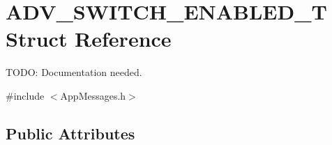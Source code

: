 \hypertarget{struct_a_d_v___s_w_i_t_c_h___e_n_a_b_l_e_d___t}{}\section{A\+D\+V\+\_\+\+S\+W\+I\+T\+C\+H\+\_\+\+E\+N\+A\+B\+L\+E\+D\+\_\+\+T Struct Reference}
\label{struct_a_d_v___s_w_i_t_c_h___e_n_a_b_l_e_d___t}


T\+O\+D\+O\+: Documentation needed.  




{\ttfamily \#include $<$App\+Messages.\+h$>$}

\subsection*{Public Attributes}
